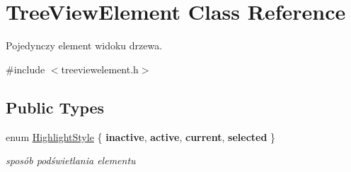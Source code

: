 \hypertarget{class_tree_view_element}{
\section{TreeViewElement Class Reference}
\label{class_tree_view_element}
}


Pojedynczy element widoku drzewa.  




{\ttfamily \#include $<$treeviewelement.h$>$}

\subsection*{Public Types}
\begin{DoxyCompactItemize}
\item 
enum \hyperlink{class_tree_view_element_a5253fdcb86d28b2545214d4d5e47af2c}{HighlightStyle} \{ {\bfseries inactive}, 
{\bfseries active}, 
{\bfseries current}, 
{\bfseries selected}
 \}
\begin{DoxyCompactList}\small\item\em sposób podświetlania elementu \item\end{DoxyCompactList}\end{DoxyCompactItemize}
